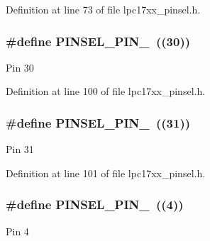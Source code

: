Definition at line 73 of file lpc17xx\+\_\+pinsel.\+h.

\subsubsection[{\texorpdfstring{P\+I\+N\+S\+E\+L\+\_\+\+P\+I\+N\+\_\+30}{PINSEL_PIN_30}}]{\setlength{\rightskip}{0pt plus 5cm}\#define P\+I\+N\+S\+E\+L\+\_\+\+P\+I\+N\+\_~((30))}\hypertarget{group___p_i_n_s_e_l___public___macros_ga8b7430cef75c76e4824a34093cb037c6}{}\label{group___p_i_n_s_e_l___public___macros_ga8b7430cef75c76e4824a34093cb037c6}
Pin 30 

Definition at line 100 of file lpc17xx\+\_\+pinsel.\+h.

\subsubsection[{\texorpdfstring{P\+I\+N\+S\+E\+L\+\_\+\+P\+I\+N\+\_\+31}{PINSEL_PIN_31}}]{\setlength{\rightskip}{0pt plus 5cm}\#define P\+I\+N\+S\+E\+L\+\_\+\+P\+I\+N\+\_~((31))}\hypertarget{group___p_i_n_s_e_l___public___macros_ga07d3d7517dd2653ef8d0644a353f1101}{}\label{group___p_i_n_s_e_l___public___macros_ga07d3d7517dd2653ef8d0644a353f1101}
Pin 31 

Definition at line 101 of file lpc17xx\+\_\+pinsel.\+h.

\subsubsection[{\texorpdfstring{P\+I\+N\+S\+E\+L\+\_\+\+P\+I\+N\+\_\+4}{PINSEL_PIN_4}}]{\setlength{\rightskip}{0pt plus 5cm}\#define P\+I\+N\+S\+E\+L\+\_\+\+P\+I\+N\+\_~((4))}\hypertarget{group___p_i_n_s_e_l___public___macros_ga160a6ed203a310444304dd0c284bb698}{}\label{group___p_i_n_s_e_l___public___macros_ga160a6ed203a310444304dd0c284bb698}
Pin 4 

